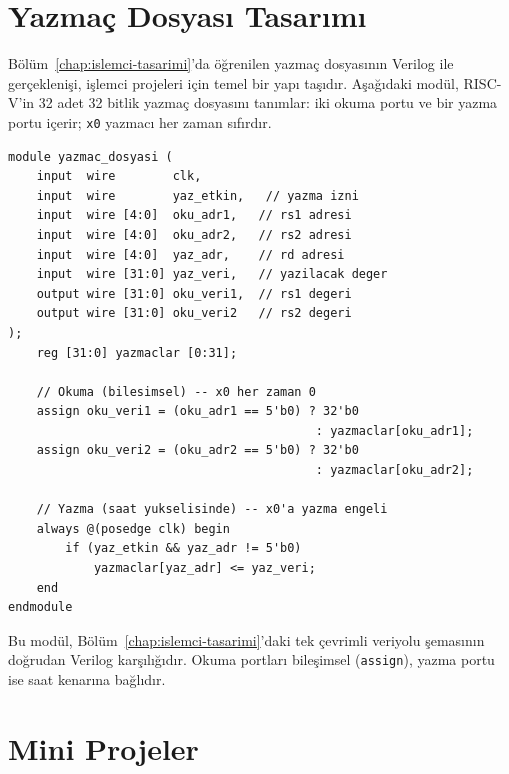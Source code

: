 \section{Yazmaç Dosyası Tasarımı}
\label{sec:ekd-yazmac-dosyasi}

Bölüm~\ref{chap:islemci-tasarimi}'da öğrenilen yazmaç dosyasının Verilog ile gerçeklenişi, işlemci projeleri için temel bir yapı taşıdır. Aşağıdaki modül, RISC-V'in 32 adet 32 bitlik yazmaç dosyasını tanımlar: iki okuma portu ve bir yazma portu içerir; \texttt{x0} yazmacı her zaman sıfırdır.

\begin{lstlisting}[style=verilog, caption={RISC-V yazmaç dosyası (32$\times$32)}, label={lst:ekd-yazmac}]
module yazmac_dosyasi (
    input  wire        clk,
    input  wire        yaz_etkin,   // yazma izni
    input  wire [4:0]  oku_adr1,   // rs1 adresi
    input  wire [4:0]  oku_adr2,   // rs2 adresi
    input  wire [4:0]  yaz_adr,    // rd adresi
    input  wire [31:0] yaz_veri,   // yazilacak deger
    output wire [31:0] oku_veri1,  // rs1 degeri
    output wire [31:0] oku_veri2   // rs2 degeri
);
    reg [31:0] yazmaclar [0:31];

    // Okuma (bilesimsel) -- x0 her zaman 0
    assign oku_veri1 = (oku_adr1 == 5'b0) ? 32'b0
                                           : yazmaclar[oku_adr1];
    assign oku_veri2 = (oku_adr2 == 5'b0) ? 32'b0
                                           : yazmaclar[oku_adr2];

    // Yazma (saat yukselisinde) -- x0'a yazma engeli
    always @(posedge clk) begin
        if (yaz_etkin && yaz_adr != 5'b0)
            yazmaclar[yaz_adr] <= yaz_veri;
    end
endmodule
\end{lstlisting}

Bu modül, Bölüm~\ref{chap:islemci-tasarimi}'daki tek çevrimli veriyolu şemasının doğrudan Verilog karşılığıdır. Okuma portları bileşimsel (\texttt{assign}), yazma portu ise saat kenarına bağlıdır.


\section{Mini Projeler}
\label{sec:ekd-projeler}

